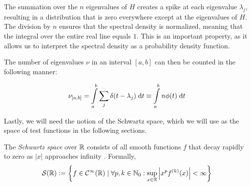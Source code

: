 The summation over the $n$ eigenvalues of $H$ creates a spike at each eigenvalue $\lambda_j$, resulting in a distribution that is zero everywhere except at the eigenvalues of $H$. The division by $n$ ensures that the spectral density is normalized, meaning that the integral over the entire real line equals $1$. This is an important property, as it allows us to interpret the spectral density as a probability density function.

The number of eigenvalues $\nu$ in an interval $[a, b]$ can then be counted in the following manner:

\begin{equation} \label{eq:nu_a_b}
    \nu_{[a, b]} = \int\limits_a^b \sum_j \delta(t - \lambda_j) \;\mathrm{d}t \equiv \int\limits_a^b n \phi(t) \;\mathrm{d}t
\end{equation}

Lastly, we will need the notion of the Schwartz space, which we will use as the space of test functions in the following sections.

\begin{definition} \label{def:Schwartz space}
    The \emph{Schwartz space} over $\mathbb{R}$ consists of all smooth functions $f$ that decay rapidly to zero as $|x|$ approaches infinity \cite{richtmyer}.
    Formally,
    \[
    \mathcal{S}(\mathbb{R}) := \left\{f \in \mathcal{C}^{\infty}(\mathbb{R}) \mid \forall p, k \in \mathbb{N}_0: \sup_{x \in \mathbb{R}} \left| x^p f^{(k)}(x) \right| < \infty \right\}
    \]
\end{definition}